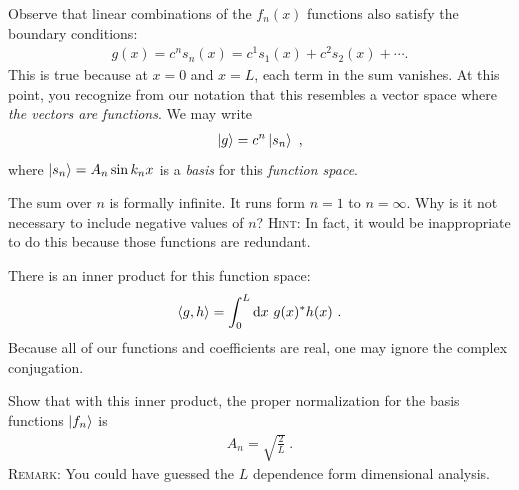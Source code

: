 Observe that linear combinations of the $f_n(x)$ functions also satisfy the boundary conditions:
\begin{align}
    g(x) = c^n s_n(x) = c^1 s_1(x) + c^2 s_2(x) + \cdots. 
\end{align}
This is true because at $x=0$ and $x=L$, each term in the sum vanishes. At this point, you recognize from our notation that this resembles a vector space where \emph{the vectors are functions}. We may write
\begin{align}
    \left|g\right\rangle = c^n \left|s_n\right\rangle \ ,
\end{align}
where $\left|s_n\right\rangle =A_n \sin k_n x$ is a \emph{basis} for this \emph{function space}. 
\begin{exercise}
The sum over $n$ is formally infinite. It runs form $n=1$ to $n=\infty$. Why is it not necessary to include negative values of $n$? \textsc{Hint:} In fact, it would be inappropriate to do this because those functions are redundant.
\end{exercise}

There is an inner product for this function space:
\begin{align}
    \langle g, h \rangle = \int_0^L \operatorname{d}\mkern-3mu^{}\mkern-1mu{x}\,\, g(x)^* h(x) \ .
\end{align}
Because all of our functions and coefficients are real, one may ignore the complex conjugation.
\begin{exercise}
Show that with this inner product, the proper normalization for the basis functions $\left|f_n\right\rangle$ is
\begin{align}
    A_n = \sqrt{\frac{2}{L}} \ .
\end{align}
\textsc{Remark}: You could have guessed the $L$ dependence form dimensional analysis.\sidenotemark
\end{exercise}

